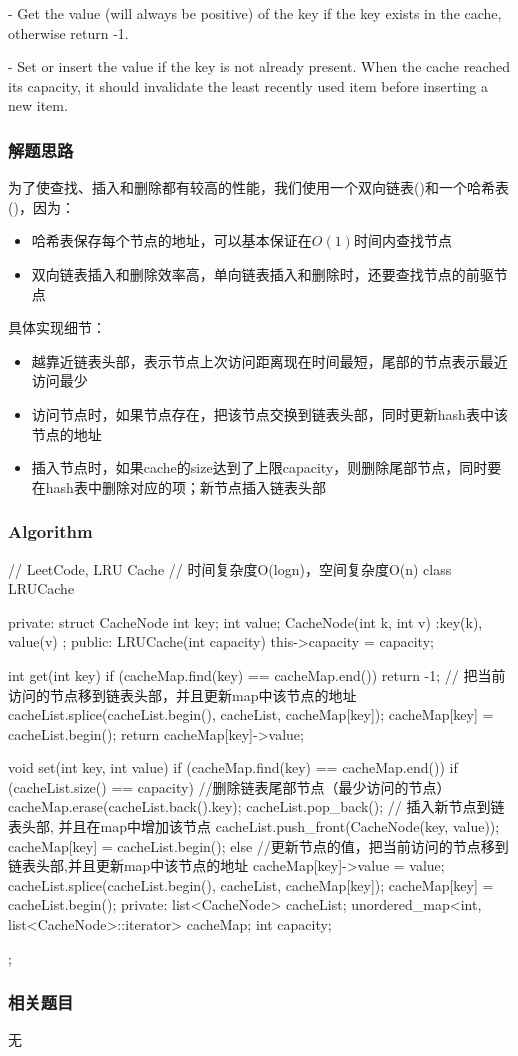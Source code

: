  - Get the value (will always be positive) of the key if the key 
exists in the cache, otherwise return -1.

 - Set or insert the value if the key is not already 
present. When the cache reached its capacity, it should invalidate the least 
recently used item before inserting a new item.


\subsubsection{解题思路}
为了使查找、插入和删除都有较高的性能，我们使用一个双向链表()和一个哈希表()，因为：
\begin{itemize}
	\item{哈希表保存每个节点的地址，可以基本保证在$O(1)$时间内查找节点}
	\item{双向链表插入和删除效率高，单向链表插入和删除时，还要查找节点的前驱节点}
\end{itemize}

具体实现细节：
\begin{itemize}
	\item{越靠近链表头部，表示节点上次访问距离现在时间最短，尾部的节点表示最近访问最少}
	\item{访问节点时，如果节点存在，把该节点交换到链表头部，同时更新hash表中该节点的地址}
	\item{插入节点时，如果cache的size达到了上限capacity，则删除尾部节点，同时要在hash表中删除对应的项；新节点插入链表头部}
	              
\end{itemize}


\subsubsection{Algorithm}
\begin{Code}
	// LeetCode, LRU Cache
	// 时间复杂度O(logn)，空间复杂度O(n)
	class LRUCache{
	private:
		struct CacheNode {
			int key;
			int value;
			CacheNode(int k, int v) :key(k), value(v){}
		};
	public:
		LRUCache(int capacity) {
			this->capacity = capacity;
		}
		
		int get(int key) {
			if (cacheMap.find(key) == cacheMap.end()) return -1;
			// 把当前访问的节点移到链表头部，并且更新map中该节点的地址
			cacheList.splice(cacheList.begin(), cacheList, cacheMap[key]); 
			cacheMap[key] = cacheList.begin();
			return cacheMap[key]->value;
		}
		
		void set(int key, int value) {
			if (cacheMap.find(key) == cacheMap.end()) {
				if (cacheList.size() == capacity) { //删除链表尾部节点（最少访问的节点）
					cacheMap.erase(cacheList.back().key);
					cacheList.pop_back();
				}
				// 插入新节点到链表头部, 并且在map中增加该节点
				cacheList.push_front(CacheNode(key, value));
				cacheMap[key] = cacheList.begin();
			} else {//更新节点的值，把当前访问的节点移到链表头部,并且更新map中该节点的地址
				cacheMap[key]->value = value;
				cacheList.splice(cacheList.begin(), cacheList, cacheMap[key]);
				cacheMap[key] = cacheList.begin();
			}
		}
	private:
		list<CacheNode> cacheList;
		unordered_map<int, list<CacheNode>::iterator> cacheMap;
		int capacity;
	};
\end{Code}


\subsubsection{相关题目}
\begindot
\item 无
\myenddot